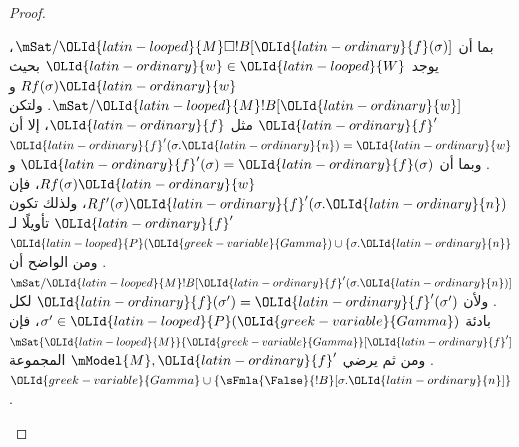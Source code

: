 \documentclass[../../../include/open-logic-section]{subfiles}
\begin{document}
\begin{proof}
\begin{enumerate}
{{  بما أن $\mSat/{{\OLId{latin-looped}{M}}}{\Box !B}[{\OLId{latin-ordinary}{f}}(\sigma)]$، يوجد ${\OLId{latin-ordinary}{w}} \in {\OLId{latin-looped}{W}}$ بحيث
  $Rf(\sigma){\OLId{latin-ordinary}{w}}$ و$\mSat/{{\OLId{latin-looped}{M}}}{!B}[{\OLId{latin-ordinary}{w}}]$. ولتكن ${\OLId{latin-ordinary}{f}}'$ مثل ${\OLId{latin-ordinary}{f}}$، إلا أن
  ${\OLId{latin-ordinary}{f}}'(\sigma.{\OLId{latin-ordinary}{n}}) = {\OLId{latin-ordinary}{w}}$. وبما أن ${\OLId{latin-ordinary}{f}}'(\sigma) = {\OLId{latin-ordinary}{f}}(\sigma)$ و
  $Rf(\sigma){\OLId{latin-ordinary}{w}}$، فإن $Rf'(\sigma){\OLId{latin-ordinary}{f}}'(\sigma.{\OLId{latin-ordinary}{n}})$، ولذلك تكون ${\OLId{latin-ordinary}{f}}'$
  تأويلًا لـ${\OLId{latin-looped}{P}}({\OLId{greek-variable}{Gamma}}) \cup \{\sigma.{\OLId{latin-ordinary}{n}}\}$. ومن الواضح أن
  $\mSat/{{\OLId{latin-looped}{M}}}{!B}[{\OLId{latin-ordinary}{f}}'(\sigma.{\OLId{latin-ordinary}{n}})]$. ولأن ${\OLId{latin-ordinary}{f}}(\sigma') = {\OLId{latin-ordinary}{f}}'(\sigma')$ لكل
  بادئة $\sigma' \in {\OLId{latin-looped}{P}}({\OLId{greek-variable}{Gamma}})$، فإن $\mSat{{\OLId{latin-looped}{M}}}{{\OLId{greek-variable}{Gamma}}}[{\OLId{latin-ordinary}{f}}']$. ومن ثم
  يرضي $\mModel{M}, {\OLId{latin-ordinary}{f}}'$ المجموعة ${\OLId{greek-variable}{Gamma}} \cup
  \{\sFmla{\False}{!B}[\sigma.{\OLId{latin-ordinary}{n}}]\}$.}
  }{}

\end{enumerate}
\end{proof}
\end{document}
